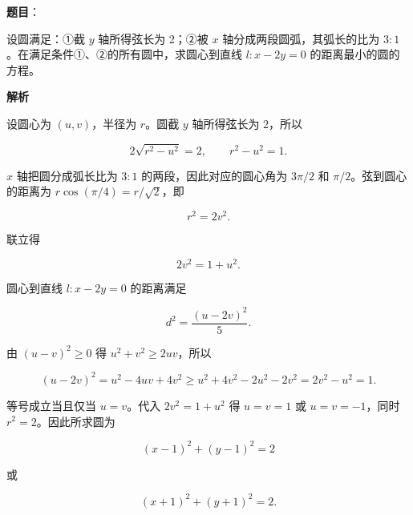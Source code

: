\begin{answer}

\textbf{题目}：

设圆满足：①截 $y$ 轴所得弦长为 2；②被 $x$ 轴分成两段圆弧，其弧长的比为 $3:1$。在满足条件①、②的所有圆中，求圆心到直线 $l:x-2y=0$ 的距离最小的圆的方程。

\textbf{解析}

设圆心为 $(u,v)$，半径为 $r$。圆截 $y$ 轴所得弦长为 $2$，所以

\nopagebreak[4]
\[
2\sqrt{r^2-u^2}=2,\qquad r^2-u^2=1.
\]

$x$ 轴把圆分成弧长比为 $3:1$ 的两段，因此对应的圆心角为 $3\pi/2$ 和 $\pi/2$。弦到圆心的距离为 $r\cos(\pi/4)=r/\sqrt2$，即

\nopagebreak[4]
\[
r^2=2v^2.
\]

联立得

\nopagebreak[4]
\[
2v^2=1+u^2.
\]

圆心到直线 $l:x-2y=0$ 的距离满足

\nopagebreak[4]
\[
d^2=\frac{(u-2v)^2}{5}.
\]

由 $(u-v)^2\geqslant0$ 得 $u^2+v^2\geqslant2uv$，所以

\nopagebreak[4]
\[
(u-2v)^2
=u^2-4uv+4v^2
\geqslant u^2+4v^2-2u^2-2v^2
=2v^2-u^2=1.
\]

等号成立当且仅当 $u=v$。代入 $2v^2=1+u^2$ 得 $u=v=1$ 或 $u=v=-1$，同时 $r^2=2$。因此所求圆为

\nopagebreak[4]
\[
(x-1)^2+(y-1)^2=2
\]

或

\nopagebreak[4]
\[
(x+1)^2+(y+1)^2=2.
\]


\end{answer}